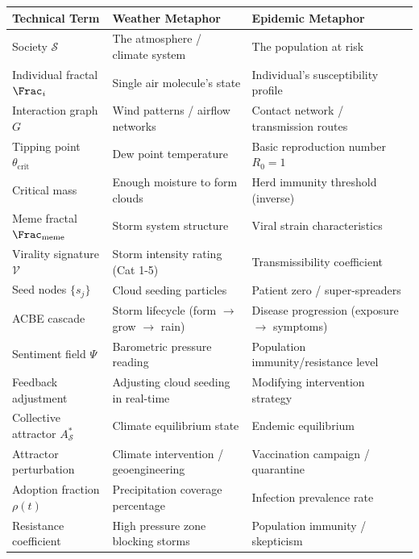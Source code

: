 \begin{center}
\small
\begin{tabularx}{\textwidth}{>{\raggedright\arraybackslash}p{3.5cm}|>{\raggedright\arraybackslash}X|>{\raggedright\arraybackslash}X}
\toprule
\textbf{Technical Term} & \textbf{Weather Metaphor} & \textbf{Epidemic Metaphor} \\
\midrule
Society $\mathcal{S}$ & The atmosphere / climate system & The population at risk \\
\midrule
Individual fractal $\Frac_i$ & Single air molecule's state & Individual's susceptibility profile \\
\midrule
Interaction graph $G$ & Wind patterns / airflow networks & Contact network / transmission routes \\
\midrule
Tipping point $\theta_{\mathrm{crit}}$ & Dew point temperature & Basic reproduction number $R_0 = 1$ \\
\midrule
Critical mass & Enough moisture to form clouds & Herd immunity threshold (inverse) \\
\midrule
Meme fractal $\Frac_{\mathrm{meme}}$ & Storm system structure & Viral strain characteristics \\
\midrule
Virality signature $\mathcal{V}$ & Storm intensity rating (Cat 1-5) & Transmissibility coefficient \\
\midrule
Seed nodes $\{s_j\}$ & Cloud seeding particles & Patient zero / super-spreaders \\
\midrule
ACBE cascade & Storm lifecycle (form $\to$ grow $\to$ rain) & Disease progression (exposure $\to$ symptoms) \\
\midrule
Sentiment field $\Psi$ & Barometric pressure reading & Population immunity/resistance level \\
\midrule
Feedback adjustment & Adjusting cloud seeding in real-time & Modifying intervention strategy \\
\midrule
Collective attractor $A_{\mathcal{S}}^*$ & Climate equilibrium state & Endemic equilibrium \\
\midrule
Attractor perturbation & Climate intervention / geoengineering & Vaccination campaign / quarantine \\
\midrule
Adoption fraction $\rho(t)$ & Precipitation coverage percentage & Infection prevalence rate \\
\midrule
Resistance coefficient & High pressure zone blocking storms & Population immunity / skepticism \\
\bottomrule
\end{tabularx}
\end{center}

